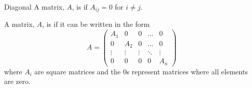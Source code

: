 \begin{dfn}{Diagonal}{}
    A matrix, \(A\), is  if \(A_{ij} = 0\) for \(i \ne j\).
    
    A matrix, \(A\), is  if it can be written in the form
    \begin{equation}
        A = 
        \begin{pmatrix}
            A_1 & 0 & 0 & \dots & 0\\
            0 & A_2 & 0 & \dots & 0\\
            \vdots & \vdots & \vdots & \ddots & \vdots\\
            0 & 0 & 0 & 0 & A_n
        \end{pmatrix}
    \end{equation}
    where \(A_i\) are square matrices and the \(0\)s represent matrices where all elements are zero.
\end{dfn}    

